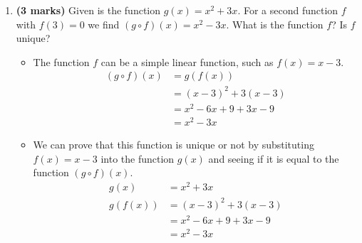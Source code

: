\documentclass[12pt]{report}
\begin{document}
\begin{enumerate}[leftmargin=\labelsep]
\newpage

    \item {\bf (3 marks)} Given is the function $g(x)=x^2+3x$. For a second function $f$ with $f(3)=0$ we find $(g \circ f)(x)=x^2-3x$. What is the function $f$? Is $f$ unique?
        \begin{tcolorbox}
            \begin{itemize}[label={}]
                \item The function $f$ can be a simple linear function, such as $f(x)=x-3$. 
                \begin{equation*}
                    \begin{split}
                        (g \circ f)(x) &= g(f(x)) \\
                        &= (x-3)^2+3(x-3) \\
                        &= x^2-6x+9+3x-9 \\
                        &= x^2-3x
                    \end{split}
                \end{equation*}
                \item We can prove that this function is unique or not by substituting $f(x)=x-3$ into the function $g(x)$ and seeing if it is equal to the function $(g \circ f)(x)$.
                \begin{equation*}
                    \begin{split}
                        g(x) &= x^2+3x \\
                        g(f(x)) &= (x-3)^2+3(x-3) \\
                        &= x^2-6x+9+3x-9 \\
                        &= x^2-3x
                    \end{split}
                \end{equation*}
            \end{itemize}
        \end{tcolorbox}

\newpage        
    

\end{enumerate}
\end{document}
